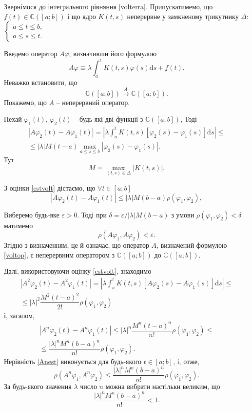 \documentclass[14pt,twoside]{extreport}
\theoremstyle{mystyle}
\numberwithin{equation}{chapter}
\newcommand{\cab}{\mathbb{C}([a; b])}
\begin{document}
Звернімося до інтегрального рівняння \eqref{volterra}. Припускатимемо, що $f(t) \in \cab$ і що ядро $K(t, s)$ неперервне у замкненому трикутнику $\Delta$: $\left\{\begin{array}{l}a\leqslant t \leqslant b,\\ a\leqslant s \leqslant t.\end{array}\right.$

Введемо оператор $A\varphi$, визначивши його формулою
\begin{equation}\label{voltop}
 A\varphi \equiv \lambda \int_{a}^{t} K(t, s) \varphi(s) \mathrm{d}s + f(t).
\end{equation}
Неважко встановити, що
\[
 \cab \xrightarrow{A} \cab.
\]
Покажемо, що $A$ -- неперервний оператор.

Нехай $\varphi_1(t)$, $\varphi_2(t)$ -- будь-які дві функції з $\cab$, Тоді
\begin{multline}\label{estvolt}
|A\varphi_2(t) - A\varphi_1(t)| = \left|\lambda \int_{a}^{t} K(t, s) [\varphi_2(s) - \varphi_1(s)] \mathrm{d}s\right|\leqslant\\
\leqslant |\lambda| M (t-a) \max\limits_{a\leqslant s \leqslant b} |\varphi_2(s) - \varphi_1(s)|.
\end{multline}
Тут
\[
 M = \max\limits_{(t, s) \in \Delta} |K(t, s)|.
\]

З оцінки \eqref{estvolt} дістаємо, що $\forall t \in [a; b]$
\[
 |A\varphi_2(t) - A\varphi_1(t)| \leqslant |\lambda| M (b-a) \rho(\varphi_1, \varphi_2),
\]

Виберемо будь-яке $\varepsilon > 0$. Тоді при $\delta = \varepsilon/|\lambda|M(b-a)$ з умови $\rho(\varphi_1, \varphi_2) < \delta$ матимемо
\[
 \rho(A\varphi_1, A\varphi_2) < \varepsilon.
\]
Згідно з визначенням, це й означає, що оператор $A$, визначений формулою \eqref{voltop}, є неперервним оператором з $\cab$ до $\cab$.

Далі, використовуючи оцінку \eqref{estvolt}, знаходимо
\begin{multline*}
 |A^2\varphi_2(t) - A^2\varphi_1(t)| = \left|\lambda \int_{a}^{t} K(t, s)[A\varphi_2(s) - A\varphi_1(s)]\mathrm{d}s\right|\leqslant\\
 \leqslant |\lambda|^2 \dfrac{M^2(t-a)^2}{2!} \rho(\varphi_1, \varphi_2)
\end{multline*}
і, загалом,
\begin{multline}\label{Anest}
 |A^n\varphi_2(t) - A^n\varphi_1(t)| \leqslant |\lambda|^n \dfrac{M^n(t-a)^n}{n!}\rho(\varphi_1, \varphi_2) \leqslant\\
 \leqslant \dfrac{|\lambda|^n M^n (b-a)^n}{n!} \rho(\varphi_1, \varphi_2).
\end{multline}
Нерівність \eqref{Anest} виконується для будь-якого $t\in[a; b]$, і, отже,
\begin{equation}\label{Anestfin}
 \rho(A^n \varphi_1, A^n\varphi_2) \leqslant \dfrac{|\lambda|^n M^n (b-a)^n}{n!} \rho(\varphi_1, \varphi_2).
\end{equation}
За будь-якого значення $\lambda$ число $n$ можна вибрати настільки великим, що
\[
 \dfrac{|\lambda|^n M^n (b-a)^n}{n!} < 1.
\]
\end{document}
